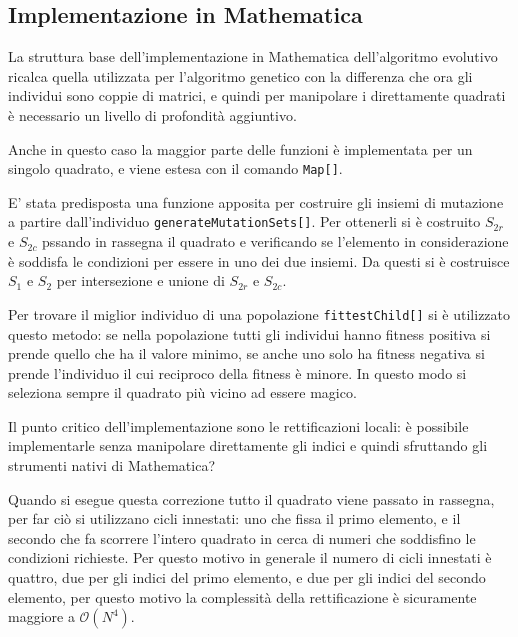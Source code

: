 \documentclass[italian,twoside,twocolumn]{article}
\begin{document}
\subsection{Implementazione in Mathematica}

La struttura base dell'implementazione in Mathematica dell'algoritmo evolutivo ricalca quella utilizzata per l'algoritmo genetico con la differenza che ora gli individui sono coppie di matrici, e quindi per manipolare i direttamente quadrati è necessario un livello di profondità aggiuntivo. 

Anche in questo caso la maggior parte delle funzioni è implementata per un singolo quadrato, e viene estesa con il comando \texttt{Map[]}.

E' stata predisposta una funzione apposita per costruire gli insiemi di mutazione a partire dall'individuo \texttt{generateMutationSets[]}. Per ottenerli si è costruito $ S_{2r} $ e $ S_{2c} $ pssando in rassegna il quadrato e verificando se l'elemento in considerazione è soddisfa le condizioni per essere in uno dei due insiemi. Da questi si è costruisce $ S_1 $ e $ S_2 $ per intersezione e unione di $ S_{2r} $ e $ S_{2c} $.

Per trovare il miglior individuo di una popolazione \texttt{fittestChild[]} si è utilizzato questo metodo: se nella popolazione tutti gli individui hanno fitness positiva si prende quello che ha il valore minimo, se anche uno solo ha fitness negativa si prende l'individuo il cui reciproco della fitness è minore. In questo modo si seleziona sempre il quadrato più vicino ad essere magico.

Il punto critico dell'implementazione sono le rettificazioni locali: è possibile implementarle senza manipolare direttamente gli indici e quindi sfruttando gli strumenti nativi di Mathematica?

Quando si esegue questa correzione tutto il quadrato viene passato in rassegna, per far ciò si utilizzano cicli innestati: uno che fissa il primo elemento, e il secondo che fa scorrere l'intero quadrato in cerca di numeri che soddisfino le condizioni richieste. Per questo motivo in generale il numero di cicli innestati è quattro, due per gli indici del primo elemento, e due per gli indici del secondo elemento, per questo motivo la complessità della rettificazione è sicuramente maggiore a $\mathcal{O}(N^4)$. 
\end{document}
